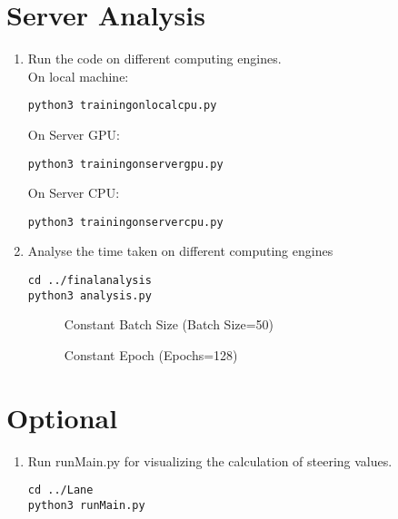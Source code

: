 \documentclass[journal,12pt,twocolumn]{IEEEtran}
\numberwithin{equation}{section}
\renewcommand\thesection{\arabic{section}}
\begin{document}
\section{Server Analysis}
\begin{enumerate}[label=\thesection.\arabic*.,ref=\thesection.\theenumi]
\item Run the code on different computing engines.\\
On local machine:
\begin{lstlisting}
python3 trainingonlocalcpu.py
\end{lstlisting}
On Server GPU:
\begin{lstlisting}
python3 trainingonservergpu.py
\end{lstlisting}  
On Server CPU:
\begin{lstlisting}
python3 trainingonservercpu.py
\end{lstlisting}
\item Analyse the time taken on different computing engines
\begin{lstlisting}
cd ../finalanalysis
python3 analysis.py 
\end{lstlisting}
\begin{figure}[!ht]
\begin{centering}
\end{centering}
\caption{Constant Batch Size (Batch Size=50)}
\end{figure}
\begin{figure}[!ht]
\begin{centering}
\end{centering}
\caption{Constant Epoch (Epochs=128)}
\end{figure}
\end{enumerate}
\section{Optional}
\begin{enumerate}[label=\thesection.\arabic*.,ref=\thesection.\theenumi]
\item Run runMain.py for visualizing the calculation of steering values.
\begin{lstlisting}
cd ../Lane
python3 runMain.py
\end{lstlisting}
\end{enumerate}
\end{document}
